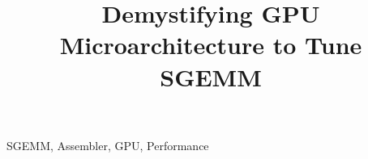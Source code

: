 \documentclass{sig-alternate-05-2015}
\begin{document}






\title{Demystifying GPU Microarchitecture to Tune SGEMM}
\subtitle{}


\maketitle




\keywords
SGEMM, Assembler, GPU, Performance








%
%




\newpage
\newpage
\pagebreak

\appendix

\end{document}
